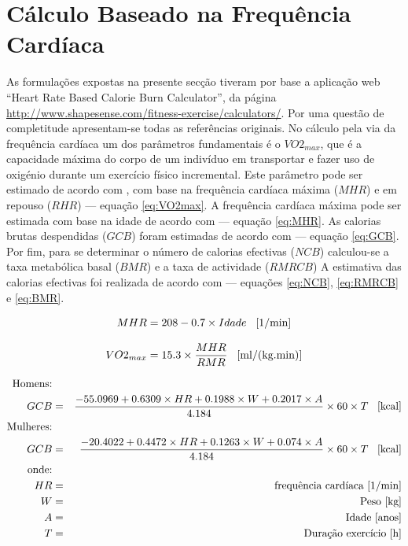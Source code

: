 \documentclass[a4paper,10pt]{report}
\begin{document}
\section{Cálculo Baseado na Frequência Cardíaca}
\label{sec:caloriasFcardio}
As formulações expostas na presente secção tiveram por base a aplicação web ``Heart Rate Based Calorie Burn Calculator'', 
da página \url{http://www.shapesense.com/fitness-exercise/calculators/}. Por uma questão de completitude apresentam-se todas as referências originais.
No cálculo pela via da frequência cardíaca um dos parâmetros fundamentais é o $VO2_{max}$, que é a capacidade máxima do corpo de um 
indivíduo em transportar e fazer uso de oxigénio durante um exercício físico incremental.
Este parâmetro pode ser estimado de acordo com \cite{VO2max}, com base na frequência cardíaca máxima ($MHR$) e em 
repouso ($RHR$) --- equação \ref{eq:VO2max}.
A frequência cardíaca máxima pode ser estimada com base na idade de acordo com \cite{MHR} --- equação \ref{eq:MHR}.
As calorias brutas despendidas ($GCB$) foram estimadas de acordo com \cite{GCB} --- equação \ref{eq:GCB}.
Por fim, para se determinar o número de calorias efectivas ($NCB$) calculou-se a taxa metabólica basal ($BMR$) e a taxa de actividade ($RMRCB$)
A estimativa das calorias efectivas foi realizada de acordo com \cite{NCB} --- equações \ref{eq:NCB}, \ref{eq:RMRCB} e \ref{eq:BMR}.

\begin{equation} \label{eq:MHR} 
MHR = 208 - 0.7 \times Idade \text{\hspace*{0.3cm}[1/min]}
\end{equation}

\begin{equation} \label{eq:VO2max} 
VO2_{max} = 15.3 \times \frac{MHR}{RMR} \text{\hspace*{0.3cm}[ml/(kg.min)]}
\end{equation}

\begin{eqnarray} \label{eq:GCB}
\text{Homens:}&&\\ 
GCB &=& \frac{-55.0969 + 0.6309 \times HR + 0.1988 \times W + 0.2017 \times A}{4.184} \times 60 \times T \text{\hspace*{0.3cm}[kcal]}\nonumber\\
\text{Mulheres:}&&\nonumber\\ 
GCB &=& \frac{-20.4022 + 0.4472 \times HR + 0.1263 \times W + 0.074 \times A}{4.184} \times 60 \times T \text{\hspace*{0.3cm}[kcal]}\nonumber\\
\text{onde:}&& \nonumber\\
HR &=& \text{frequência cardíaca [1/min]}\nonumber\\ 
W &=& \text{Peso [kg]}\nonumber\\
A &=& \text{Idade [anos]}\nonumber\\
T &=& \text{Duração exercício [h]}\nonumber
\end{eqnarray}
\end{document}
